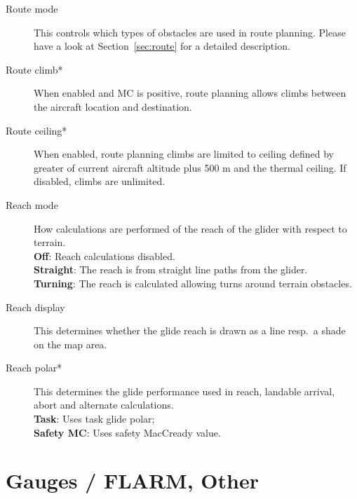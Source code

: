 \begin{description}
\item[Route mode]  \label{conf:routemode} This controls which types
  of obstacles are used in route planning. Please have a look at Section~\ref{sec:route} 
  for a detailed description.
\item[Route climb*]  \label{conf:routeclimb} When enabled and MC is positive, route 
  planning allows climbs between the aircraft location and destination.
\item[Route ceiling*]  \label{conf:routeceiling} When enabled, route planning climbs 
  are limited to ceiling defined by greater of current aircraft altitude plus 
  500 m and the thermal ceiling.  If disabled, climbs are unlimited.
\\
\item[Reach mode]  \label{conf:turningreach} How calculations are performed of 
  the reach of the glider with respect to terrain. \\
  {\bf Off}: Reach calculations disabled. \\
  {\bf Straight}: The reach is from straight line paths from the glider. \\
  {\bf Turning}: The reach is calculated allowing turns around terrain obstacles.
\item[Reach display]  \label{conf:gliderange} This determines whether the
glide reach is drawn as a line resp.\ a shade on the map area.
\item[Reach polar*]  \label{conf:reachpolar} This determines the glide performance 
  used in reach, landable arrival, abort and alternate calculations. \\
  {\bf Task}: Uses task glide polar; \\
  {\bf Safety MC}: Uses safety MacCready value.
\end{description}


\section{Gauges / FLARM, Other} \label{sec:vario-gauge}


